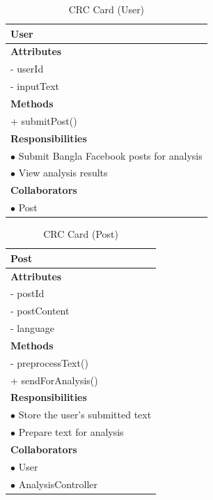 \documentclass[12pt,a4paper]{report}
\begin{document}
\begin{table}[H]
\centering
\caption{CRC Card (User)}
\label{tab:crc_user}
\begin{tabularx}{\textwidth}{|X|}
\hline
\textbf{User} \\
\hline
\textbf{Attributes} \\
- userId \\
- inputText \\
\hline
\textbf{Methods} \\
+ submitPost() \\
\hline
\textbf{Responsibilities} \\
$\bullet$ Submit Bangla Facebook posts for analysis \\
$\bullet$ View analysis results \\
\hline
\textbf{Collaborators} \\
$\bullet$ Post \\
\hline
\end{tabularx}
\end{table}

\begin{table}[H]
\centering
\caption{CRC Card (Post)}
\label{tab:crc_post}
\begin{tabularx}{\textwidth}{|X|}
\hline
\textbf{Post} \\
\hline
\textbf{Attributes} \\
- postId \\
- postContent \\
- language \\
\hline
\textbf{Methods} \\
- preprocessText() \\
+ sendForAnalysis() \\
\hline
\textbf{Responsibilities} \\
$\bullet$ Store the user's submitted text \\
$\bullet$ Prepare text for analysis \\
\hline
\textbf{Collaborators} \\
$\bullet$ User \\
$\bullet$ AnalysisController \\
\hline
\end{tabularx}
\end{table}
\end{document}
